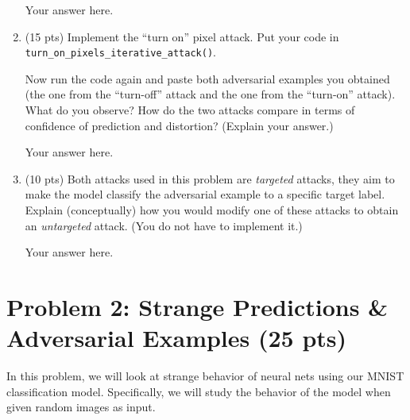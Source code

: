 \begin{enumerate}
\begin{answer}
		Your answer here.
		
	\end{answer}
	
	\item (15 pts) Implement the ``turn on'' pixel attack. Put your code in \texttt{turn\_on\_pixels\_iterative\_attack()}. 
	
	Now run the code again and paste both  adversarial examples you obtained (the one from the ``turn-off'' attack and the one from the ``turn-on'' attack). What do you observe? How do the two attacks compare in terms of confidence of prediction and distortion? (Explain your answer.)
	
	\begin{answer}
	
		Your answer here.
		
	\end{answer}
	
	\item (10 pts) 	Both attacks used in this problem are {\em targeted} attacks, they aim to make the model classify the adversarial example to a specific target label. Explain (conceptually) how you would modify one of these attacks to obtain an {\em untargeted} attack. (You do not have to implement it.)
	
	\begin{answer}
	
		Your answer here.
		
	\end{answer}
%
\end{enumerate}

\newpage
\section*{Problem 2: Strange Predictions \& Adversarial Examples (25 pts)}
%

In this problem, we will look at strange behavior of neural nets using our MNIST classification model. Specifically, we will study the behavior of the model when given random images as input. 



